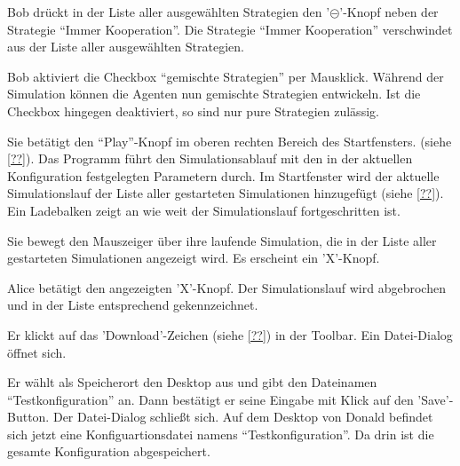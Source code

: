 \documentclass[parskip=full,11pt]{scrartcl}
\begin{document}
{Bob drückt in der Liste aller ausgewählten Strategien den '\(\circleddash\)'-Knopf neben der Strategie \enquote{Immer Kooperation}.}
{Die Strategie \enquote{Immer Kooperation} verschwindet aus der Liste aller ausgewählten Strategien.}

{Bob aktiviert die Checkbox \enquote{gemischte Strategien} per Mausklick.}
{Während der Simulation können die Agenten nun gemischte Strategien entwickeln. Ist die Checkbox hingegen deaktiviert, so sind nur pure Strategien zulässig.}


{Sie betätigt den \enquote{Play}-Knopf im oberen rechten Bereich des Startfensters. (siehe \cref{??}).}
{Das Programm führt den Simulationsablauf mit den in der aktuellen Konfiguration festgelegten Parametern durch. Im Startfenster wird der aktuelle Simulationslauf der Liste aller gestarteten Simulationen hinzugefügt (siehe \cref{??}). Ein Ladebalken zeigt an wie weit der Simulationslauf fortgeschritten ist.}

{Sie bewegt den Mauszeiger über ihre laufende Simulation, die in der Liste aller gestarteten Simulationen angezeigt wird.}
{Es erscheint ein 'X'-Knopf.}

\teststep{}
{Alice betätigt den angezeigten 'X'-Knopf.}
{Der Simulationslauf wird abgebrochen und in der Liste entsprechend gekennzeichnet.}


{Er klickt auf das 'Download'-Zeichen (siehe \cref{??}) in der Toolbar.}
{Ein Datei-Dialog öffnet sich.}

{Er wählt als Speicherort den Desktop aus und gibt den Dateinamen \enquote{Testkonfiguration} an. Dann bestätigt er seine Eingabe mit Klick auf den 'Save'-Button.}
{Der Datei-Dialog schließt sich. Auf dem Desktop von Donald befindet sich jetzt eine Konfiguartionsdatei namens \enquote{Testkonfiguration}. Da drin ist die gesamte Konfiguration abgespeichert.}
\end{document}

